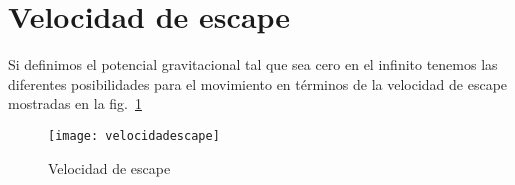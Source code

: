 \section{Velocidad de escape}

Si definimos el potencial gravitacional tal que sea cero en el infinito tenemos las diferentes posibilidades para el movimiento en términos de la velocidad de escape mostradas en la fig.~\ref{fig:velocidadescape}

\begin{frame}
\begin{figure}
  \centering
  \texttt{[image: velocidadescape]}
  \caption{Velocidad de escape}
  \label{fig:velocidadescape}
\end{figure}
\end{frame}


